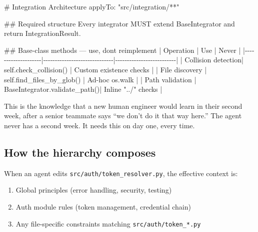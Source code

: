 \documentclass[
  a4paper,
  DIV=11,
  numbers=noendperiod]{scrreprt}
\newenvironment{Shaded}{\begin{snugshade}}{\end{snugshade}}
\newcommand{\FunctionTok}[1]{\textcolor[rgb]{0.28,0.35,0.67}{#1}}
\newcommand{\NormalTok}[1]{\textcolor[rgb]{0.00,0.23,0.31}{#1}}
\newcommand{\PreprocessorTok}[1]{\textcolor[rgb]{0.68,0.00,0.00}{#1}}
\providecommand{\tightlist}{%
  \setlength{\itemsep}{0pt}\setlength{\parskip}{0pt}}
\begin{document}
\begin{Shaded}
\begin{Highlighting}[]
\FunctionTok{\# Integration Architecture}
\NormalTok{applyTo: "src/integration/**"}

\FunctionTok{\#\# Required structure}
\NormalTok{Every integrator MUST extend BaseIntegrator and return IntegrationResult.}

\FunctionTok{\#\# Base{-}class methods — use, don\textquotesingle{}t reimplement}
\PreprocessorTok{|}\NormalTok{ Operation          }\PreprocessorTok{|}\NormalTok{ Use                          }\PreprocessorTok{|}\NormalTok{ Never                    }\PreprocessorTok{|}
\PreprocessorTok{|{-}{-}{-}{-}{-}{-}{-}{-}{-}{-}{-}{-}{-}{-}{-}{-}{-}{-}{-}{-}|{-}{-}{-}{-}{-}{-}{-}{-}{-}{-}{-}{-}{-}{-}{-}{-}{-}{-}{-}{-}{-}{-}{-}{-}{-}{-}{-}{-}{-}{-}|{-}{-}{-}{-}{-}{-}{-}{-}{-}{-}{-}{-}{-}{-}{-}{-}{-}{-}{-}{-}{-}{-}{-}{-}{-}{-}|}
\PreprocessorTok{|}\NormalTok{ Collision detection}\PreprocessorTok{|}\NormalTok{ self.check\_collision()       }\PreprocessorTok{|}\NormalTok{ Custom existence checks  }\PreprocessorTok{|}
\PreprocessorTok{|}\NormalTok{ File discovery     }\PreprocessorTok{|}\NormalTok{ self.find\_files\_by\_glob()    }\PreprocessorTok{|}\NormalTok{ Ad{-}hoc os.walk           }\PreprocessorTok{|}
\PreprocessorTok{|}\NormalTok{ Path validation    }\PreprocessorTok{|}\NormalTok{ BaseIntegrator.validate\_path()}\PreprocessorTok{|}\NormalTok{ Inline "../" checks      }\PreprocessorTok{|}
\end{Highlighting}
\end{Shaded}

This is the knowledge that a new human engineer would learn in their
second week, after a senior teammate says ``we don't do it that way
here.'' The agent never has a second week. It needs this on day one,
every time.

\subsection{How the hierarchy
composes}\label{how-the-hierarchy-composes}

When an agent edits \texttt{src/auth/token\_resolver.py}, the effective
context is:

\begin{enumerate}
\def\labelenumi{\arabic{enumi}.}
\tightlist
\item
  Global principles (error handling, security, testing)
\item
  Auth module rules (token management, credential chain)
\item
  Any file-specific constraints matching \texttt{src/auth/token\_*.py}
\end{enumerate}
\end{document}
